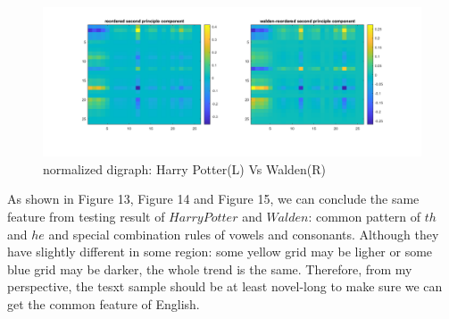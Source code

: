 \documentclass[a4paper]{article}
\begin{document}
\begin{figure}[H] 
\centering 
\includegraphics[width=1.0\textwidth]{2.6-3.png}
\caption{normalized digraph: Harry Potter(L) Vs Walden(R)} 
\label{Fig.2.6-3} 
\end{figure}

As shown in Figure 13, Figure 14 and Figure 15, we can conclude the same feature from testing result of $Harry Potter$ and $Walden$: common pattern of $th$ and $he$ and special combination rules of vowels and consonants. Although they have slightly different in some region: some yellow grid may be ligher or some blue grid may be darker, the whole trend is the same. Therefore, from my perspective, the tesxt sample should be at least novel-long to make sure we can get the common feature of English.
\end{document}
